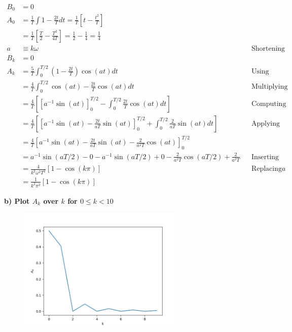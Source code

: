 \begin{align*}
	B_0 &= 0\\
    A_0 &= \frac{1}{T} \int 1 - \frac{2t}{T} dt
    = \frac{1}{T} \left[ t - \frac{t^2}{T} \right]\\
    &= \frac{1}{T} \left[ \frac{T}{2} - \frac{T^2}{4T} \right]
    = \frac{1}{2} - \frac{1}{4} = \frac{1}{4}\\
	a &\equiv k\omega & & \text{Shortening notation}\\
	B_k &= 0\\
	A_k &= \frac{5}{T} \int_0^{T/2} \left( 1-\frac{2t}{T} \right) \cos(at) dt & & \text{Using symmetry and odd property}\\
	&= \frac{4}{T} \int_0^{T/2} \cos(at)-\frac{2t}{T} \cos(at) dt & & \text{Multiplying cosine}\\
	&= \frac{4}{T} \left[ \left[ a^{-1} \sin(at) \right]_0^{T/2} - \int_0^{T/2} \frac{2t}{T} \cos(at) dt \right] & & \text{Computing first integral}\\
	&= \frac{4}{T} \left[ \left[ a^{-1} \sin(at) - \frac{2t}{aT} \sin(at) \right]_0^{T/2} + \int_0^{T/2} \frac{2}{aT} \sin(at) dt \right] & & \text{Applying product rule}\\
	&= \frac{4}{T} \left[ a^{-1} \sin(at) - \frac{2t}{aT} \sin(at) - \frac{2}{a^2T} \cos(at)  \right]_0^{T/2} \\
	&= a^{-1} \sin(aT/2) - 0
		- a^{-1} \sin(aT/2) + 0
		- \frac{2}{a^2T} \cos(aT/2) + \frac{2}{a^2T} & & \text{Inserting boundaries}\\
	&= \frac{4}{k^2\omega^2T^2} [1 - \cos(k\pi) ] & & \text{Replacing} a\\
	&= \frac{1}{k^2\pi^2} [1 - \cos(k\pi) ]
\end{align*}

\newpage

\textbf{b) Plot $A_k$ over $k$ for $0 \leq k < 10$}
\\



\begin{figure}[H]
	\includegraphics[width=8cm]{img/ex_5_b.png}
	\centering
\end{figure}

